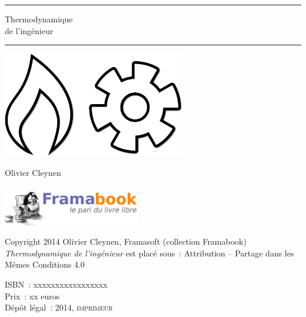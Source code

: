 \begin{titlepage}
\vspace*{4cm}
\begin{center}
	\vspace{1em}\par \rule{15cm}{.1pt}
	{\HUGE Thermodynamique\\ de l’ingénieur}
	\vspace{1em}\par \rule{15cm}{.1pt}

	\vspace{4cm}
	\includegraphics[width=8cm]{images/thermodynamics.png}
	\vspace{2cm}

	{\LARGE Olivier Cleynen\\
	\ccLogo\ \ccAttribution\ \ccShareAlike}\\
	\includegraphics[width=60mm]{images/Logo_framabook_grand.png}
\end{center}

\clearpage

\begin{center}
		\noindent Copyright 2014 Olivier Cleynen, Framasoft (collection Framabook)\\
		\textit{Thermodynamique de l’ingénieur} est placé sous~: Attribution -- Partage dans les Mêmes Conditions 4.0

		\noindent ISBN~: xxxxxxxxxxxxxxxxx \\
		Prix~: xx euros \\
		Dépôt légal~: 2014, \textsc{imprimeur}
\end{center}


\end{titlepage}
\restoregeometry
